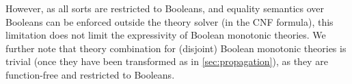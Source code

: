 \documentclass[runningheads]{llncs}
\newcommand{\comments}[1]{}
\newcommand{\eg}{\emph{e.g.}}
\begin{document}
However, as all sorts are restricted to Booleans, and equality semantics over Booleans can be enforced outside the theory solver (in the CNF formula), this limitation does not limit the expressivity of Boolean monotonic theories. We further note that theory combination for (disjoint) Boolean monotonic theories is trivial (once they have been transformed as in \autoref{sec:propagation}), as they are function-free and restricted to Booleans. 



\comments{
Nelson-Oppen can be used to combine decision procedures for theories under the following conditions: 

\begin{enumerate}
\item The theories must be \textit{stably infinite}, a technical requirement that has been partially relaxed in a subsequent work (\eg~\cite{tinelli2003combining}).
\item The theories have \textit{disjoint} signatures (that is, the theories may have sorts in common, but may not have any functions or predicates in common, excluding equality).
\item The theories must both support equality relations.
\end{enumerate}
}
\end{document}
